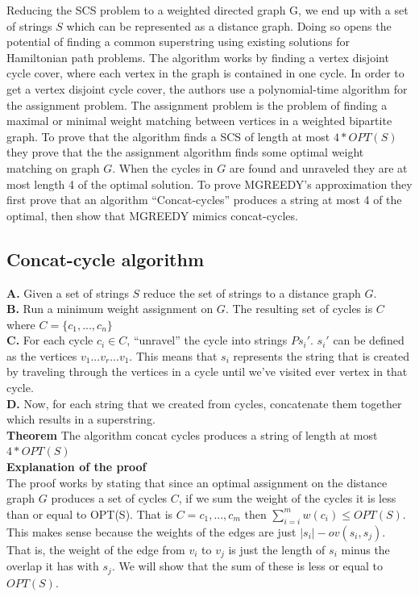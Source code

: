 \documentclass[letterpaper,11pt,titlepage]{article}
\begin{document}
Reducing the SCS problem to a weighted directed  graph G, we end up with a set of strings $S$ which can be represented as a distance graph. Doing so opens the potential of finding a common superstring using existing solutions for Hamiltonian path problems. The algorithm works by finding a vertex disjoint cycle cover, where each vertex in the graph is contained in one cycle. In order to get a vertex disjoint cycle cover, the authors use a polynomial-time algorithm for the assignment problem. The assignment problem is the problem of finding a maximal or minimal weight matching between vertices in a weighted bipartite graph. To prove that the algorithm finds a SCS of length at most $4 * OPT(S)$ they prove that the the assignment algorithm finds some optimal weight matching on graph $G$. When the cycles in $G$ are found and unraveled they are at most length 4 of the optimal solution. To prove MGREEDY's approximation they first prove that an algorithm ``Concat-cycles'' produces a string at most 4 of the optimal, then show that MGREEDY mimics concat-cycles.

\subsection*{Concat-cycle algorithm}

\textbf{A.} Given a set of strings $S$ reduce the set of strings to a distance graph $G$. \\
\textbf{B.} Run a minimum weight assignment on $G$. The resulting set of cycles is $C$ where $C = \{c_1, ..., c_n\}$\\
\textbf{C.} For each cycle $c_i \in C$,  ``unravel'' the cycle into strings $Ps_i'$. $s_i'$ can be defined as the vertices $v_1 ... v_r ... v_1$. This means that $s_i$ represents the  string that is created by traveling through the vertices in a cycle until we've visited ever vertex in that cycle.\\
\textbf{D.} Now, for each string that we created from cycles, concatenate them together which results in a superstring.\\

\textbf{Theorem}
The algorithm concat cycles produces a string of length at most $4 * OPT(S)$\\

\textbf{Explanation of the proof}\\

The proof works by stating that since an optimal assignment on the distance graph $G$ produces a set of cycles $C$, if we sum the weight of the cycles it is less than or equal to OPT(S). That is $C = {c_1, ..., c_m}$ then $\sum_{i=i}^m w(c_i) \leq OPT(S)$. This makes sense because the weights of the edges are just $|s_i| - ov(s_i,s_j)$. That is, the weight of the edge from $v_i$ to $v_j$ is just the length of $s_i$ minus the overlap it has with $s_j$. We will show that the sum of these is less or equal to $OPT(S)$.
\end{document}

